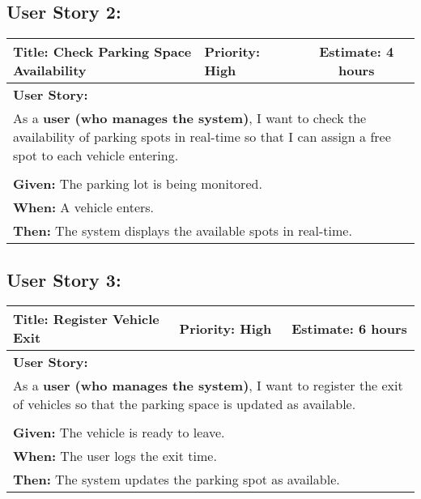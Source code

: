 \subsection{User Story 2:}
\begin{table}[h]
    \centering
    \begin{tabular}{|p{7cm}|p{4cm}|c|}
        \hline
        \rowcolor{lightblue}
        \textbf{Title: Check Parking Space Availability} & \textbf{Priority: High} & \textbf{Estimate: 4 hours} \\
        \hline
        \multicolumn{3}{|l|}{\textbf{User Story:}} \\
        \multicolumn{3}{|p{15cm}|}{As a \textbf{user (who manages the system)}, I want to check the availability of parking spots in real-time so that I can assign a free spot to each vehicle entering.} \\
        \hline
        \rowcolor{lightblue}
        \multicolumn{3}{|c|}{\textbf{Acceptance Criteria:}} \\
        \hline
        \multicolumn{3}{|l|}{\textbf{Given:} The parking lot is being monitored.} \\
        \multicolumn{3}{|l|}{\textbf{When:} A vehicle enters.} \\
        \multicolumn{3}{|l|}{\textbf{Then:} The system displays the available spots in real-time.} \\
        \hline
    \end{tabular}
\end{table}

\subsection{User Story 3:}
\begin{table}[h]
    \centering
    \begin{tabular}{|p{7cm}|p{4cm}|c|}
        \hline
        \rowcolor{lightblue}
        \textbf{Title: Register Vehicle Exit} & \textbf{Priority: High} & \textbf{Estimate: 6 hours} \\
        \hline
        \multicolumn{3}{|l|}{\textbf{User Story:}} \\
        \multicolumn{3}{|p{15cm}|}{As a \textbf{user (who manages the system)}, I want to register the exit of vehicles so that the parking space is updated as available.} \\
        \hline
        \rowcolor{lightblue}
        \multicolumn{3}{|c|}{\textbf{Acceptance Criteria:}} \\
        \hline
        \multicolumn{3}{|l|}{\textbf{Given:} The vehicle is ready to leave.} \\
        \multicolumn{3}{|l|}{\textbf{When:} The user logs the exit time.} \\
        \multicolumn{3}{|l|}{\textbf{Then:} The system updates the parking spot as available.} \\
        \hline
    \end{tabular}
\end{table}

